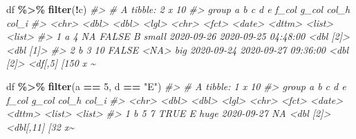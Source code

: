 \documentclass[
]{report}
\newenvironment{Shaded}{\begin{snugshade}}{\end{snugshade}}
\newcommand{\CommentTok}[1]{\textcolor[rgb]{0.56,0.35,0.01}{\textit{#1}}}
\newcommand{\DecValTok}[1]{\textcolor[rgb]{0.00,0.00,0.81}{#1}}
\newcommand{\KeywordTok}[1]{\textcolor[rgb]{0.13,0.29,0.53}{\textbf{#1}}}
\newcommand{\NormalTok}[1]{#1}
\newcommand{\OperatorTok}[1]{\textcolor[rgb]{0.81,0.36,0.00}{\textbf{#1}}}
\newcommand{\StringTok}[1]{\textcolor[rgb]{0.31,0.60,0.02}{#1}}
\begin{document}
\begin{Shaded}
\begin{Highlighting}[]
\NormalTok{df }\OperatorTok{\%\textgreater{}\%}
\StringTok{  }\KeywordTok{filter}\NormalTok{(}\OperatorTok{!}\NormalTok{c)}
\CommentTok{\#\textgreater{} \# A tibble: 2 x 10}
\CommentTok{\#\textgreater{}   group     a     b c     d     e     f\_col      g\_col               col\_h     col\_i           }
\CommentTok{\#\textgreater{}   \textless{}chr\textgreater{} \textless{}dbl\textgreater{} \textless{}dbl\textgreater{} \textless{}lgl\textgreater{} \textless{}chr\textgreater{} \textless{}fct\textgreater{} \textless{}date\textgreater{}     \textless{}dttm\textgreater{}              \textless{}list\textgreater{}    \textless{}list\textgreater{}          }
\CommentTok{\#\textgreater{} 1 a         4    NA FALSE B     small 2020{-}09{-}26 2020{-}09{-}25 04:48:00 \textless{}dbl [2]\textgreater{} \textless{}dbl [1]\textgreater{}       }
\CommentTok{\#\textgreater{} 2 b         3    10 FALSE \textless{}NA\textgreater{}  big   2020{-}09{-}24 2020{-}09{-}27 09:36:00 \textless{}dbl [2]\textgreater{} \textless{}df[,5] [150 x \textasciitilde{}}
\end{Highlighting}
\end{Shaded}

\begin{Shaded}
\begin{Highlighting}[]
\NormalTok{df }\OperatorTok{\%\textgreater{}\%}
\StringTok{  }\KeywordTok{filter}\NormalTok{(a }\OperatorTok{==}\StringTok{ }\DecValTok{5}\NormalTok{, d }\OperatorTok{==}\StringTok{ "E"}\NormalTok{)}
\CommentTok{\#\textgreater{} \# A tibble: 1 x 10}
\CommentTok{\#\textgreater{}   group     a     b c     d     e     f\_col      g\_col               col\_h     col\_i           }
\CommentTok{\#\textgreater{}   \textless{}chr\textgreater{} \textless{}dbl\textgreater{} \textless{}dbl\textgreater{} \textless{}lgl\textgreater{} \textless{}chr\textgreater{} \textless{}fct\textgreater{} \textless{}date\textgreater{}     \textless{}dttm\textgreater{}              \textless{}list\textgreater{}    \textless{}list\textgreater{}          }
\CommentTok{\#\textgreater{} 1 b         5     7 TRUE  E     huge  2020{-}09{-}27 NA                  \textless{}dbl [2]\textgreater{} \textless{}dbl[,11] [32 x\textasciitilde{}}
\end{Highlighting}
\end{Shaded}
\end{document}
